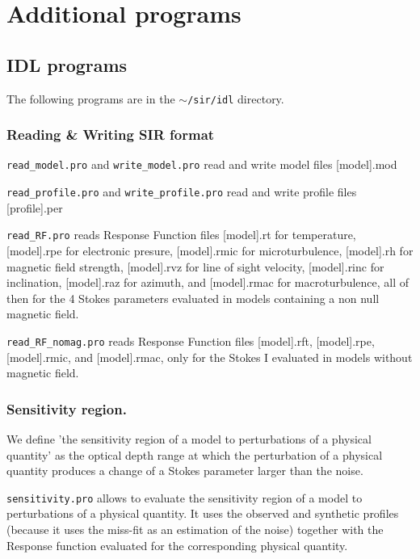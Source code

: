 
\chapter{Additional programs}

\section{IDL programs}
The following programs are in the {\tt $\sim$/sir/idl} directory.

\subsection{Reading \& Writing SIR format}
\begin {description}
\label{reading}
\item {\tt read\_model.pro} and {\tt write\_model.pro} read and write model files [model].mod
\item {\tt read\_profile.pro} and {\tt write\_profile.pro} read and write profile files [profile].per
\item {\tt read\_RF.pro} reads Response Function files [model].rt for temperature, [model].rpe for
electronic presure, [model].rmic for microturbulence, [model].rh for magnetic field strength,
[model].rvz for line of sight velocity, [model].rinc for inclination, [model].raz for azimuth,
and [model].rmac for macroturbulence, all of then
for the 4 Stokes parameters evaluated in models containing a non null magnetic field.
\item {\tt read\_RF\_nomag.pro} reads Response Function files [model].rft, [model].rpe, [model].rmic,
and  [model].rmac, only for the Stokes I evaluated in models without magnetic field.
\end {description}

\subsection{Sensitivity region.}
We define 'the sensitivity region of a model to perturbations of a physical quantity' as the optical depth range at which the perturbation of a physical 
quantity produces a change of a Stokes parameter larger than the noise.
\begin{flushleft}
{\tt sensitivity.pro} allows to evaluate the sensitivity region of a model to perturbations of a physical quantity.
It uses the observed and synthetic profiles (because it uses the miss-fit as an estimation of the noise) together with the Response function 
evaluated for the corresponding physical quantity.
\end{flushleft}

